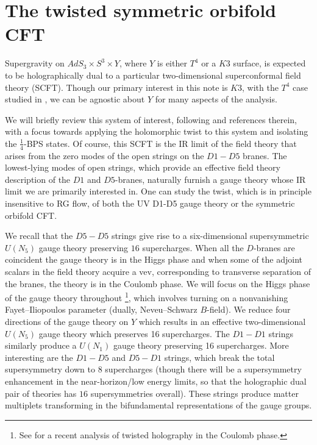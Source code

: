 \documentclass[../main.tex]{subfiles}
\begin{document}
\section{The twisted symmetric orbifold CFT}\label{sec:CFT}

Supergravity on $AdS_3 \times S^3 \times Y$, where $Y$ is either $T^4$ or a $K3$ surface, is expected to be holographically dual to a particular two-dimensional superconformal field theory (SCFT). Though our primary interest in this note is $K3$, with the $T^4$ case studied in \cite{CP}, we can be agnostic about $Y$ for many aspects of the analysis. 

We will briefly review this system of interest, following \cite{Davidetal} and references therein, with a focus towards applying the holomorphic twist to this system and isolating the $\frac14$-BPS states. Of course, this SCFT is the IR limit of the field theory that arises from the zero modes of the open strings on the $D1-D5$ branes. 
The lowest-lying modes of open strings, which provide an effective field theory description of the $D1$ and $D5$-branes, naturally furnish a gauge theory whose IR limit we are primarily interested in. One can study the twist, which is in principle insensitive to RG flow, of both the UV D1-D5 gauge theory or the symmetric orbifold CFT.

We recall that the $D5-D5$ strings give rise to a six-dimensional supersymmetric $U(N_5)$ gauge theory preserving $16$ supercharges. 
When all the $D$-branes are coincident the gauge theory is in the Higgs phase and when some of the adjoint scalars in the field theory acquire a vev, corresponding to transverse separation of the branes, the theory is in the Coulomb phase. 
We will focus on the Higgs phase of the gauge theory throughout \footnote{See \cite{Budzik:2022hcd} for a recent analysis of twisted holography in the Coulomb phase.}, which involves turning on a nonvanishing Fayet--Iliopoulos parameter (dually, Neveu--Schwarz $B$-field). 
We reduce four directions of the gauge theory on $Y$
which results in an effective two-dimensional $U(N_5)$ gauge theory which preserves 16 supercharges.
The $D1-D1$ strings similarly produce a $U(N_1)$ gauge theory preserving 16 supercharges. 
More interesting are the $D1-D5$ and $D5-D1$ strings, which break the total supersymmetry down to $8$ supercharges (though there will be a supersymmetry enhancement in the near-horizon/low energy limits, so that the holographic dual pair of theories has $16$ supersymmetries overall). 
These strings produce matter multiplets transforming in the bifundamental representations of the gauge groups. 
\end{document}
